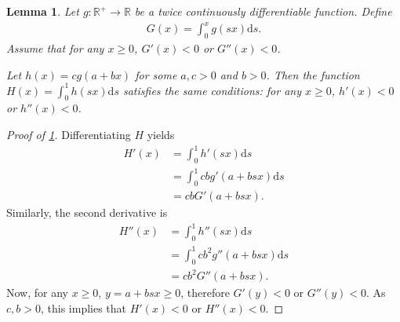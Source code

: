\documentclass[a4paper]{article}
\newtheorem{lemma}{Lemma}
\newcommand{\ds}{\mathrm{d}s}
\begin{document}
\begin{lemma}
    \label{lem:single_crossing_affine_transformation}
    Let $g: \mathbb{R}^+ \to \mathbb{R}$ be a twice continuously differentiable function.
    Define
    \begin{align*}
        G(x) = \int_0^x g(sx) \ds.
    \end{align*}
    Assume that for any $x \geq 0$, $G'(x) < 0$ or $G''(x) < 0$.

    Let $h(x) = c g(a + bx)$ for some $a, c > 0$ and $b > 0$.
    Then the function $H(x) = \int_0^1 h(sx) \ds$ satisfies the same conditions: for any $x \geq 0$, $h'(x) < 0$ or $h''(x) < 0$.
\end{lemma}
\begin{proof}[Proof of \cref{lem:single_crossing_affine_transformation}]
    Differentiating $H$ yields
    \begin{align*}
        H'(x) &= \int_0^1 h'(sx) \ds \\
              &= \int_0^1 c b g'(a + bsx) \ds \\
              &= c b G'(a + bsx).
    \end{align*}
    Similarly, the second derivative is
    \begin{align*}
        H''(x) &= \int_0^1 h''(sx) \ds \\
               &= \int_0^1 c b^2 g''(a + bsx) \ds \\
               &= c b^2 G''(a + bsx).
    \end{align*}
    Now, for any $x \geq 0$, $y = a + bsx \geq 0$, therefore $G'(y) < 0$ or $G''(y) < 0$.
    As $c, b > 0$, this implies that $H'(x) < 0$ or $H''(x) < 0$.
\end{proof}
\end{document}
